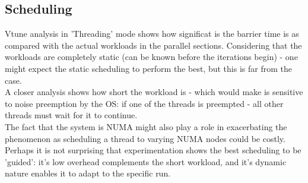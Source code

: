 \subsection*{Scheduling}
Vtune analysis in 'Threading' mode shows
how significat is the barrier time is as 
compared with the actual workloads in the parallel sections.
Considering that the workloads are completely
static (can be known before the iterations begin) -
one might expect the static scheduling
to perform the best, but this is far from the case.\\

A closer analysis shows how short the workload is - 
which would make is sensitive to noise preemption by the OS:
if one of the threads is preempted -
all other threads must wait for it to continue.\\
The fact that the system is NUMA might also play a
role in exacerbating the phenomenon as scheduling a thread
to varying NUMA nodes could be costly.\\
Perhaps it is not surprising that experimentation shows
the best scheduling to be 'guided':
it's low overhead complements the short workload,
and it's dynamic nature enables it to adapt to 
the specific run.
